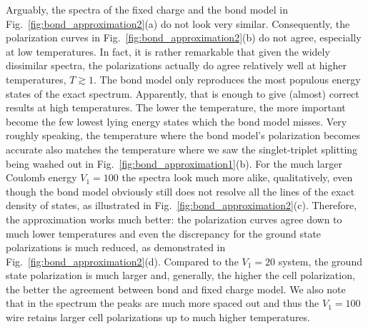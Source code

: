 Arguably, the spectra of the fixed charge and the bond model in
Fig.~\ref{fig:bond_approximation2}(a) do not look very similar. Consequently,
the polarization curves in Fig.~\ref{fig:bond_approximation2}(b) do not agree,
especially at low temperatures. In fact, it is rather remarkable that given the
widely dissimilar spectra, the polarizations actually do agree relatively well
at higher temperatures, $T \gtrsim 1$. The bond model only reproduces the most
populous energy states of the exact spectrum. Apparently, that is enough to give
(almost) correct results at high temperatures. The lower the temperature, the
more important become the few lowest lying energy states which the bond model
misses. Very roughly speaking, the temperature where the bond model's
polarization becomes accurate also matches the temperature where we saw the
singlet-triplet splitting being washed out in
Fig.~\ref{fig:bond_approximation1}(b). For the much larger Coulomb energy $V_1 =
100$ the spectra look much more alike, qualitatively, even though the bond model
obviously still does not resolve all the lines of the exact density of states,
as illustrated in Fig.~\ref{fig:bond_approximation2}(c). Therefore, the
approximation works much better: the polarization curves agree down to much
lower temperatures and even the discrepancy for the ground state polarizations
is much reduced, as demonstrated in Fig.~\ref{fig:bond_approximation2}(d).
Compared to the $V_1 = 20$ system, the ground state polarization is much larger
and, generally, the higher the cell polarization, the better the agreement
between bond and fixed charge model. We also note that in the spectrum the peaks
are much more spaced out and thus the $V_1 = 100$ wire retains larger cell
polarizations up to much higher temperatures.

